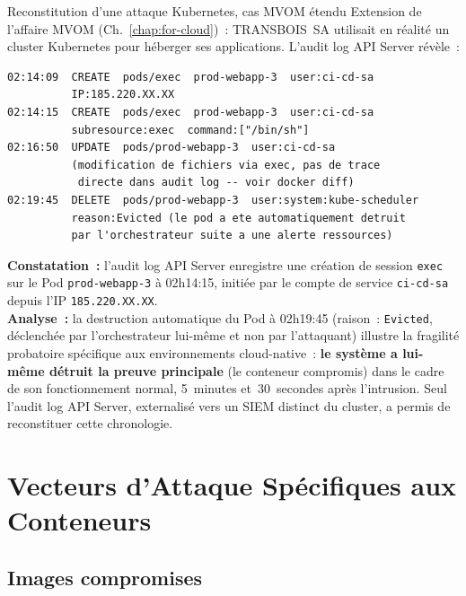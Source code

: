 \begin{boxscenario}{Reconstitution d'une attaque Kubernetes, cas MVOM étendu}
Extension de l'affaire MVOM (Ch.~\ref{chap:for-cloud})~: TRANSBOIS~SA
utilisait en réalité un cluster Kubernetes pour héberger ses applications.
L'audit log API Server révèle~:

\begin{lstlisting}[language=bash_forensique]
02:14:09  CREATE  pods/exec  prod-webapp-3  user:ci-cd-sa
          IP:185.220.XX.XX
02:14:15  CREATE  pods/exec  prod-webapp-3  user:ci-cd-sa
          subresource:exec  command:["/bin/sh"]
02:16:50  UPDATE  pods/prod-webapp-3  user:ci-cd-sa
          (modification de fichiers via exec, pas de trace
           directe dans audit log -- voir docker diff)
02:19:45  DELETE  pods/prod-webapp-3  user:system:kube-scheduler
          reason:Evicted (le pod a ete automatiquement detruit
          par l'orchestrateur suite a une alerte ressources)
\end{lstlisting}

\textbf{Constatation~:} l'audit log API Server enregistre une
création de session \texttt{exec} sur le Pod \texttt{prod-webapp-3}
à 02h14:15, initiée par le compte de service \texttt{ci-cd-sa}
depuis l'IP \texttt{185.220.XX.XX}.\\[0.3ex]
\textbf{Analyse~:} la destruction automatique du Pod à 02h19:45
(raison~: \texttt{Evicted}, déclenchée par l'orchestrateur
lui-même et non par l'attaquant) illustre la fragilité probatoire
spécifique aux environnements cloud-native~: \textbf{le système
a lui-même détruit la preuve principale} (le conteneur compromis)
dans le cadre de son fonctionnement normal, 5~minutes et~30~secondes
après l'intrusion. Seul l'audit log API Server, externalisé
vers un SIEM distinct du cluster, a permis de reconstituer
cette chronologie.
\end{boxscenario}

\section{Vecteurs d'Attaque Spécifiques aux Conteneurs}
\label{sec:vecteurs-attaque}

\subsection{Images compromises}

